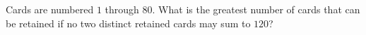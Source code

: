 Cards are numbered $1$ through $80$. What is the greatest number of cards that can be retained if no two distinct retained cards may sum to $120$?
